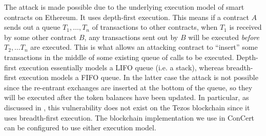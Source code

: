 \documentclass[twoside,11pt,openright]{report}
\begin{document}
The attack is made possible due to the underlying execution model of smart contracts on Ethereum. It uses depth-first execution. This means if a contract $A$ sends out a queue $T_1,\dots,T_n$ of transactions to other contracts, when $T_1$ is received by some other contract $B$, any transactions sent out by $B$ will be executed \textit{before} $T_2,\dots T_n$ are executed. This is what allows an attacking contract to ``insert'' some transactions in the middle of some existing queue of calls to be executed. Depth-first execution essentially models a LIFO queue (i.e. a stack), whereas breadth-first execution models a FIFO queue. In the latter case the attack is not possible since the re-entrant exchanges are inserted at the bottom of the queue, so they will be executed after the token balances have been updated. In particular, as discussed in \cite{erc777-attacks-tezos}, this vulnerability does not exist on the Tezos blockchain since it uses breadth-first execution. The blockchain implementation we use in ConCert can be configured to use either execution model.
\end{document}

